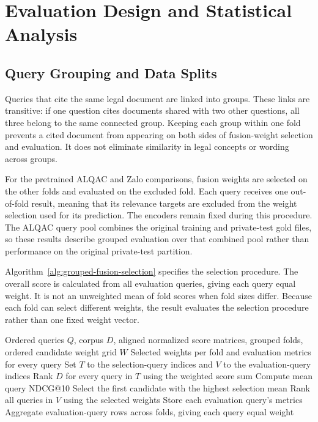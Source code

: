 \section{Evaluation Design and Statistical Analysis}
\label{sec:evaluation-design}

\subsection{Query Grouping and Data Splits}

Queries that cite the same legal document are linked into groups. These links are transitive: if one question cites documents shared with two other questions, all three belong to the same connected group. Keeping each group within one fold prevents a cited document from appearing on both sides of fusion-weight selection and evaluation. It does not eliminate similarity in legal concepts or wording across groups.

For the pretrained ALQAC and Zalo comparisons, fusion weights are selected on the other folds and evaluated on the excluded fold. Each query receives one out-of-fold result, meaning that its relevance targets are excluded from the weight selection used for its prediction. The encoders remain fixed during this procedure. The ALQAC query pool combines the original training and private-test gold files, so these results describe grouped evaluation over that combined pool rather than performance on the original private-test partition.

Algorithm~\ref{alg:grouped-fusion-selection} specifies the selection procedure. The overall score is calculated from all evaluation queries, giving each query equal weight. It is not an unweighted mean of fold scores when fold sizes differ. Because each fold can select different weights, the result evaluates the selection procedure rather than one fixed weight vector.

\begin{algorithm}[H]
\caption{Grouped selection of fusion weights and out-of-fold evaluation}
\label{alg:grouped-fusion-selection}
\footnotesize
\begin{algorithmic}[1]
\Require Ordered queries $Q$, corpus $D$, aligned normalized score matrices, grouped folds, ordered candidate weight grid $W$
\Ensure Selected weights per fold and evaluation metrics for every query
    \State Set $T$ to the selection-query indices and $V$ to the evaluation-query indices
        \State Rank $D$ for every query in $T$ using the weighted score sum
        \State Compute mean query NDCG@10
    \EndFor
    \State Select the first candidate with the highest selection mean
    \State Rank all queries in $V$ using the selected weights
    \State Store each evaluation query's metrics
\EndFor
\State Aggregate evaluation-query rows across folds, giving each query equal weight
\end{algorithmic}
\end{algorithm}

